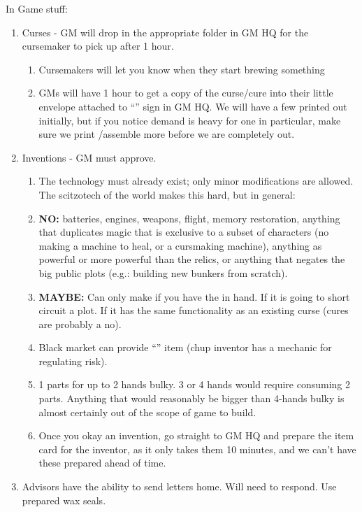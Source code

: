 \documentclass[green]{GL2020}
\begin{document}
{\large In Game stuff:}
\begin{enumerate}
	\item Curses - GM will drop in the appropriate folder in GM HQ for the cursemaker to pick up after 1 hour.
	\begin{enumerate}
		\item Cursemakers will let you know when they start brewing something
		\item GMs will have 1 hour to get a copy of the curse/cure into their little envelope attached to ``\sCurses{}'' sign in GM HQ. We will have a few printed out initially, but if you notice demand is heavy for one in particular, make sure we print /assemble more before we are completely out.
	\end{enumerate}
	\item Inventions - GM must approve.
	\begin{enumerate}
		\item The technology must already exist; only minor modifications are allowed. The scitzotech of the world makes this hard, but in general:
		\item \textbf{NO:} batteries, engines, weapons, flight, memory restoration, anything that duplicates magic that is exclusive to a subset of characters (no making a machine to heal, or a cursmaking machine), anything as powerful or more powerful than the relics, or anything that negates the big public plots (e.g.: building new bunkers from scratch).
		\item \textbf{MAYBE:} Can only make \iVidCom{} if you have the \iVCDBlueprint{} in hand. If it is going to short circuit a plot. If it has the same functionality as an existing curse (cures are probably a no).
			\item Black market can provide ``\iMagitechParts{}'' item (chup inventor has a mechanic for regulating risk).
		\item 1 \iMagitechParts{} parts for up to 2 hands bulky. 3 or 4 hands would require consuming 2 \iMagitechParts{} parts. Anything that would reasonably be bigger than 4-hands bulky is almost certainly out of the scope of game to build.
		\item Once you okay an invention, go straight to GM HQ and prepare the item card for the inventor, as it only takes them 10 minutes, and we can't have these prepared ahead of time.
	\end{enumerate}
	\item Advisors have the ability to send letters home. Will need to respond. Use prepared wax seals.

\end{enumerate}
\end{document}
